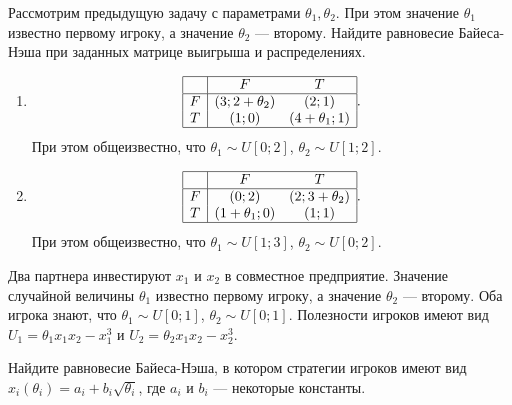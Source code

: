 \begin{problem}
Рассмотрим предыдущую задачу с параметрами $\theta_1,\theta_2$. При этом
значение  $\theta _{1} $  известно первому игроку, а значение  $\theta _{2} $  — второму. Найдите равновесие Байеса-Нэша при заданных матрице выигрыша и распределениях.

\begin{enumerate}
\item
 $$\begin{array}{|c|cc|}  \hline {} & {F} & {T} \\  \hline {F} & {\left(3;2+\theta _{2} \right)} & {\left(2;1\right)} \\ {T} & {\left(1;0\right)} & {\left(4+\theta _{1} ;1\right)} \\  \hline  \end{array}.$$ При этом общеизвестно, что  $\theta _{1} \sim U\left[0;2\right]$,  $\theta _{2} \sim U\left[1;2\right]$.\\

\item

 $$\begin{array}{|c|cc|}  \hline {} & {F} & {T} \\  \hline {F} & {\left(0;2\right)} & {\left(2;3+\theta _{2} \right)} \\ {T} & {\left(1+\theta _{1} ;0\right)} & {\left(1;1\right)} \\  \hline  \end{array}.$$
 При этом общеизвестно, что  $\theta _{1} \sim U\left[1;3\right]$,  $\theta _{2} \sim U\left[0;2\right].$




\end{enumerate}
\begin{sol}

\end{sol}
\end{problem}



\begin{problem}[Инвестиции.]
Два партнера инвестируют  $x_{1} $  и  $x_{2} $  в совместное предприятие. Значение случайной величины   $\theta _{1} $  известно первому игроку, а значение  $\theta _{2} $  — второму. Оба игрока знают, что  $\theta _{1} \sim U\left[0;1\right]$,  $\theta _{2} \sim U\left[0;1\right]$.
Полезности игроков имеют вид  $U_{1} =\theta _{1} x_{1} x_{2} -x_{1}^{3} $  и  $U_{2} =\theta _{2} x_{1} x_{2} -x_{2}^{3} $.\par
Найдите равновесие Байеса-Нэша, в котором стратегии игроков имеют вид  $x_{i} \left(\theta _{i} \right)=a_{i} +b_{i} \sqrt{\theta _{i} } $, где  $a_{i} $  и  $b_{i} $  — некоторые константы. \par




\begin{sol}

\end{sol}
\end{problem}



